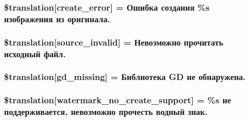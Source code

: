 \subsubsection[{\$translation}]{\setlength{\rightskip}{0pt plus 5cm}\$translation\mbox{[}\textquotesingle{}create\+\_\+error\textquotesingle{}\mbox{]} = \textquotesingle{}Ошибка создания \%s изображения из оригинала.\textquotesingle{}}\label{class_8upload_8ru___r_u_8php_a53013ce9255c4e1849098ddd9fdb2b3f}
\hypertarget{class_8upload_8ru___r_u_8php_a6ab0a660b457eaf2d3434b225449fdd6}{}
\subsubsection[{\$translation}]{\setlength{\rightskip}{0pt plus 5cm}\$translation\mbox{[}\textquotesingle{}source\+\_\+invalid\textquotesingle{}\mbox{]} = \textquotesingle{}Невозможно прочитать исходный файл.\textquotesingle{}}\label{class_8upload_8ru___r_u_8php_a6ab0a660b457eaf2d3434b225449fdd6}
\hypertarget{class_8upload_8ru___r_u_8php_a7f3dfcc0db4bbc0f2e7210c439798e56}{}
\subsubsection[{\$translation}]{\setlength{\rightskip}{0pt plus 5cm}\$translation\mbox{[}\textquotesingle{}gd\+\_\+missing\textquotesingle{}\mbox{]} = \textquotesingle{}Библиотека G\+D не обнаружена.\textquotesingle{}}\label{class_8upload_8ru___r_u_8php_a7f3dfcc0db4bbc0f2e7210c439798e56}
\hypertarget{class_8upload_8ru___r_u_8php_a82d5853430ab72dc1f9799ec36144cc6}{}
\subsubsection[{\$translation}]{\setlength{\rightskip}{0pt plus 5cm}\$translation\mbox{[}\textquotesingle{}watermark\+\_\+no\+\_\+create\+\_\+support\textquotesingle{}\mbox{]} = \textquotesingle{}\%s не поддерживается, невозможно прочесть водный знак.\textquotesingle{}}\label{class_8upload_8ru___r_u_8php_a82d5853430ab72dc1f9799ec36144cc6}
\hypertarget{class_8upload_8ru___r_u_8php_aabca0b65dadbc6184415c16375f284ca}{}

